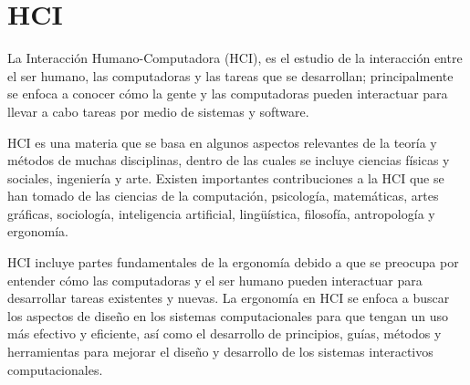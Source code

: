 \thispagestyle{plain}
\section{HCI}
	\par 
		La Interacción Humano-Computadora (HCI), es el estudio de la interacción entre el ser
		humano, las computadoras y las tareas que se desarrollan; principalmente se enfoca a
		conocer cómo la gente y las computadoras pueden interactuar para llevar a cabo tareas
		por medio de sistemas y software. 
	
	\par \noindent
		HCI es una materia que se basa en algunos aspectos relevantes de la teoría y métodos
		de muchas disciplinas, dentro de las cuales se incluye ciencias físicas y sociales,
		ingeniería y arte. Existen importantes contribuciones a la HCI que se han tomado de las
		ciencias de la computación, psicología, matemáticas, artes gráficas, sociología,
		inteligencia artificial, lingüística, filosofía, antropología y ergonomía. 
		
	\par \noindent
		HCI incluye partes fundamentales de la ergonomía debido a que se preocupa por
		entender cómo las computadoras y el ser humano pueden interactuar para desarrollar
		tareas existentes y nuevas. La ergonomía en HCI se enfoca a buscar los aspectos de
		diseño en los sistemas computacionales para que tengan un uso más efectivo y eficiente,
		así como el desarrollo de principios, guías, métodos y herramientas para mejorar el
		diseño y desarrollo de los sistemas interactivos computacionales. 

		
	
	
	